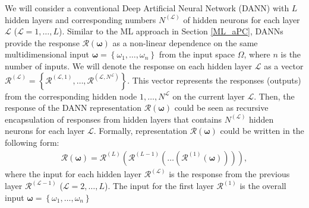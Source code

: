 \documentclass[a4paper,fleqn]{article}
\newcommand{\rw}[1]{\textcolor{blue}{#1}}
\newcommand{\del}[1]{\textcolor{red}{\sout{#1}}}
\renewcommand{\del}[1]{}
\renewcommand{\rw}[1]{#1}
\begin{document}
We will consider a conventional Deep Artificial Neural Network (DANN) with $L$ hidden layers and corresponding numbers $N^{(\mathcal{L})}$ of hidden neurons for each layer $\mathcal{L}$ ($\mathcal{L}=1,\ldots,L$). Similar to the ML approach in Section \ref{ML_aPC}, DANNs provide the response $\mathcal{R}(\bm{\omega})$ as a non-linear dependence \cite{anthony2009neural} on the same multidimensional input $\bm{\omega}=\left\{\omega_1,\ldots,\omega_n \right\}$ from the input space $\Omega$, where $n$ is the number of inputs. We will denote the response on each hidden layer $\mathcal{L}$ as a vector $\bm{\mathcal{R}}^{(\mathcal{L})}=\left\{\mathcal{R}^{(\mathcal{L},1)},\ldots,\mathcal{R}^{(\mathcal{L},N^{\mathcal{L}})}\right\}$. This vector represents the responses (outputs) from the corresponding hidden node $1,\ldots,N^{\mathcal{L}}$ on the current layer $\mathcal{L}$. Then, the response of the DANN representation $\mathcal{R}(\bm{\omega})$ could be \del{written} \rw{seen} \cite{Goodfellow2016deeplearning} as recursive encapsulation of responses \del{form} \rw{from} \rw{hidden} \del{deep} layers \rw{that contains $N^{(\mathcal{L})}$ hidden neurons  for each layer $\mathcal{L}$}. \rw{Formally, representation $\mathcal{R}(\bm{\omega})$} \del{Shortly} could be written in the following form: 
%
\begin{eqnarray}
\label{DANN_Response}
\mathcal{R}(\bm{\omega})=\bm{\mathcal{R}}^{(L)} \left(
\bm{\mathcal{R}}^{(L-1)}\left(\ldots\left(\bm{\mathcal{R}}^{(1)}\left(\bm{\omega}\right)\right)\right)\right),
\end{eqnarray}
%
where the input for each hidden layer $\bm{\mathcal{R}}^{(\mathcal{L})}$ is the response from the previous layer $\bm{\mathcal{R}}^{(\mathcal{L}-1)}$ ($\mathcal{L}=2,\ldots,L$). The input for the first layer $\bm{\mathcal{R}}^{(1)}$ is the overall input $\bm{\omega}=\left\{\omega_1,\ldots,\omega_n \right\}$ 
\end{document}
